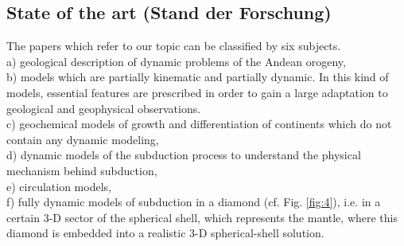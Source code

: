 \documentclass[twoside,10pt]{article}
\begin{document}
\subsection{State of the art (Stand der Forschung)}
The papers which refer to our topic can be classified by six subjects.\\
a) geological description of dynamic problems of the Andean orogeny,\\
b) models which are partially kinematic and partially dynamic. 
In this kind of models, essential features are prescribed in order to gain a large adaptation to geological and geophysical observations.\\
c) geochemical models of growth and differentiation of continents which do not contain any dynamic modeling,\\
d) dynamic models of the subduction process to understand the physical mechanism behind subduction, \\
e) circulation models, \\
f) fully dynamic models of subduction in a diamond (cf. Fig. \ref{fig:4}), i.e. in a certain 3-D sector of the spherical shell, which represents the mantle, where this diamond is embedded into a realistic 3-D spherical-shell solution.
\end{document}

